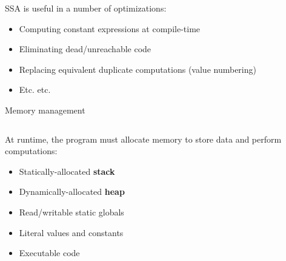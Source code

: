 \documentclass[../index.tex]{subfiles}
\begin{document}
\begin{frame}[fragile]{\currenttitle}
  SSA is useful in a number of optimizations:

  \begin{itemize}
    \item Computing constant expressions at compile-time
    \item Eliminating dead/unreachable code
    \item Replacing equivalent duplicate computations (value numbering)
    \item Etc. etc.
  \end{itemize}
\end{frame}

\renewcommand{\currenttitle}{Memory management}
\begin{frame}[fragile]{\currenttitle}
  \begin{columns}
    \begin{column}{0.6\textwidth}
      At runtime, the program must allocate memory to store data and perform
      computations:
      \begin{itemize}
        \item Statically-allocated \textbf{stack}
        \item Dynamically-allocated \textbf{heap}
        \item Read/writable static globals
        \item Literal values and constants
        \item Executable code
      \end{itemize}
    \end{column}

    \begin{column}{0.3\textwidth}
      \newcommand{\sectionn}[6]{%
        \node (#2) [
          section,
          below=0 of #3,
          minimum height=#4,
          preaction={fill, #5},
          #6
        ] {#1};%
      }
      \newcommand{\datasectionn}[3]{%
        \sectionn{#1}{#2}{#3}{5.7mm}{black!20}{font=\footnotesize}
        \draw [draw=black!50] (#2.north west) -- (#2.north east);%
      }

\end{column}
\end{columns}
\end{frame}
\end{document}
